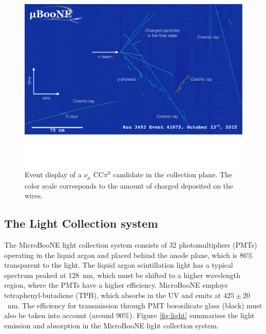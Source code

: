 \begin{figure}[htbp]
    \centering
    \includegraphics[width=0.9\linewidth]{figures/evd_ccpi0.pdf}
    \caption{Event display of a $\nu_{\mu}$ CC$\pi^0$ candidate in the collection plane. The color scale corresponds to the amount of charged deposited on the wires.}
    \label{fig:evd_ccpi0}
\end{figure}


\subsection{The Light Collection system}
The MicroBooNE light collection system consists of 32 photomultipliers (PMTs) operating in the liquid argon and placed behind the anode plane, which is 86\% transparent to the light.
The liquid argon scintillation light has a typical spectrum peaked at 128~nm, which must be shifted to a higher wavelength region, where the PMTs have a higher efficiency.
MicroBooNE employs tetraphenyl-butadiene (TPB), which absorbs in the UV and emits at $425\pm20$~nm. The efficiency for transmission through PMT borosilicate glass (black) must also be taken into account (around 90\%).
Figure \ref{fig:light} summarises the light emission and absorption in the MicroBooNE light collection system.

